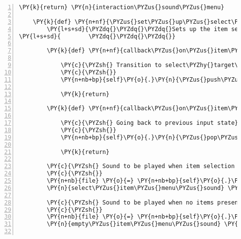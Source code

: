 \begin{Verbatim}[commandchars=\\\{\},numbers=left,firstnumber=1,stepnumber=1]
        \PY{k}{return} \PY{n}{interaction\PYZus{}sound\PYZus{}menu}

    \PY{k}{def} \PY{n+nf}{\PYZus{}set\PYZus{}up\PYZus{}select\PYZus{}item\PYZus{}menu}\PY{p}{(}\PY{n+nb+bp}{self}\PY{p}{)}\PY{p}{:}
        \PY{l+s+sd}{\PYZdq{}\PYZdq{}\PYZdq{}Sets up the item selection menu list.}
\PY{l+s+sd}{        \PYZdq{}\PYZdq{}\PYZdq{}}

        \PY{k}{def} \PY{n+nf}{callback\PYZus{}on\PYZus{}item\PYZus{}selected}\PY{p}{(}\PY{n}{select\PYZus{}item\PYZus{}menu}\PY{p}{)}\PY{p}{:}

            \PY{c}{\PYZsh{} Transition to select\PYZhy{}target\PYZhy{}input\PYZhy{}state}
            \PY{c}{\PYZsh{}}
            \PY{n+nb+bp}{self}\PY{o}{.}\PY{n}{\PYZus{}push\PYZus{}input\PYZus{}state\PYZus{}on\PYZus{}stack}\PY{p}{(}\PY{n+nb+bp}{self}\PY{o}{.}\PY{n}{INPUT\PYZus{}STATE\PYZus{}SELECT\PYZus{}TARGET}\PY{p}{)}

            \PY{k}{return}

        \PY{k}{def} \PY{n+nf}{callback\PYZus{}on\PYZus{}item\PYZus{}menu\PYZus{}exit}\PY{p}{(}\PY{n}{select\PYZus{}item\PYZus{}menu}\PY{p}{)}\PY{p}{:}

            \PY{c}{\PYZsh{} Going back to previous input state}
            \PY{c}{\PYZsh{}}
            \PY{n+nb+bp}{self}\PY{o}{.}\PY{n}{\PYZus{}pop\PYZus{}input\PYZus{}state\PYZus{}from\PYZus{}stack}\PY{p}{(}\PY{p}{)}

            \PY{k}{return}

        \PY{c}{\PYZsh{} Sound to be played when item selection menu is opened}
        \PY{c}{\PYZsh{}}
        \PY{n+nb}{file} \PY{o}{=} \PY{n+nb+bp}{self}\PY{o}{.}\PY{n}{assets}\PY{o}{.}\PY{n}{fetch}\PY{p}{(}\PY{l+s}{\PYZsq{}}\PY{l+s}{select\PYZus{}item\PYZus{}menu.ogg}\PY{l+s}{\PYZsq{}}\PY{p}{)}
        \PY{n}{select\PYZus{}item\PYZus{}menu\PYZus{}sound} \PY{o}{=} \PY{n}{pygame}\PY{o}{.}\PY{n}{mixer}\PY{o}{.}\PY{n}{Sound}\PY{p}{(}\PY{n+nb}{file}\PY{p}{)}

        \PY{c}{\PYZsh{} Sound to be played when no items present to be selected}
        \PY{c}{\PYZsh{}}
        \PY{n+nb}{file} \PY{o}{=} \PY{n+nb+bp}{self}\PY{o}{.}\PY{n}{assets}\PY{o}{.}\PY{n}{fetch}\PY{p}{(}\PY{l+s}{\PYZsq{}}\PY{l+s}{empty\PYZus{}item\PYZus{}menu.ogg}\PY{l+s}{\PYZsq{}}\PY{p}{)}
        \PY{n}{empty\PYZus{}item\PYZus{}menu\PYZus{}sound} \PY{o}{=} \PY{n}{pygame}\PY{o}{.}\PY{n}{mixer}\PY{o}{.}\PY{n}{Sound}\PY{p}{(}\PY{n+nb}{file}\PY{p}{)}


\end{Verbatim}
